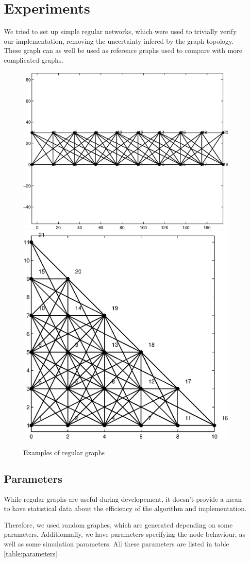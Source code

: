 \documentclass[letterpaper, 10 pt, conference]{ieeeconf}  %
\begin{document}
\section{Experiments}

We tried to set up simple regular networks, which were used to trivially verify our implementation, removing the uncertainty infered by the graph topology. These graph can as well be used as reference graphs used to compare with more complicated graphs.\newline


\begin{figure}[ht!]
\centering
\includegraphics[width=0.4\columnwidth]{reg1.eps} \includegraphics[width=0.4\columnwidth]{reg3.eps}
\caption{Examples of regular graphs}
\end{figure}

\subsection{Parameters}

While regular graphs are useful during developement, it doesn't provide a mean to have statistical data about the efficiency of the algorithm and implementation.

Therefore, we used random graphes, which are generated depending on some parameters. Additionnally, we have parameters specifying the node behaviour, as well as some simulation parameters. All these parameters are listed in table \ref{table:parameters}.
\end{document}
